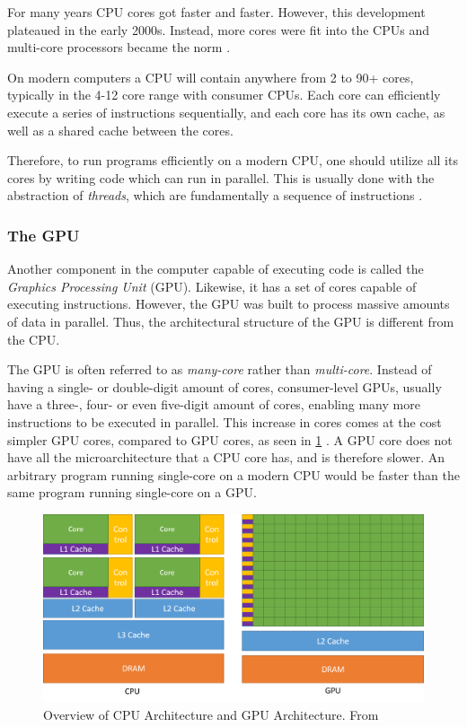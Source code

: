 \noindent For many years CPU cores got faster and faster. However, this development plateaued in the early 2000s. Instead, more cores were fit into the CPUs and multi-core processors became the norm \cite{karlrupp:processor_trend_data}.

On modern computers a CPU will contain anywhere from 2 to 90+ cores, typically in the 4-12 core range with consumer CPUs. Each core can efficiently execute a series of instructions sequentially, and each core has its own cache, as well as a shared cache between the cores.

Therefore, to run programs efficiently on a modern CPU, one should utilize all its cores by writing code which can run in parallel. This is usually done with the abstraction of \textit{threads}, which are fundamentally a sequence of instructions \cite[p. 1022]{computersystems}.

\subsubsection{The GPU} \label{sect:background_gpu}

\noindent Another component in the computer capable of executing code is called the \textit{Graphics Processing Unit} (GPU). Likewise, it has a set of cores capable of executing instructions. However, the GPU was built to process massive amounts of data in parallel. Thus, the architectural structure of the GPU is different from the CPU.

The GPU is often referred to as \textit{many-core} rather than \textit{multi-core}. Instead of having a single- or double-digit amount of cores, consumer-level GPUs, usually have a three-, four- or even five-digit amount of cores, enabling many more instructions to be executed in parallel. This increase in cores comes at the cost simpler GPU cores, compared to GPU cores, as seen in \ref{fig:cpu_vs_gpu} \cite[Sect. 1.1]{nvidia:cudadoc}. A GPU core does not have all the microarchitecture that a CPU core has, and is therefore slower. An arbitrary program running single-core on a modern CPU would be faster than the same program running single-core on a GPU.

\begin{figure}[ht]
\includegraphics[width=\textwidth]{Documents/Report/Figures/CPU vs GPU .png}
\caption{Overview of CPU Architecture and GPU Architecture. From \cite{nvidia:cudadoc}}
\label{fig:cpu_vs_gpu}
\end{figure}

